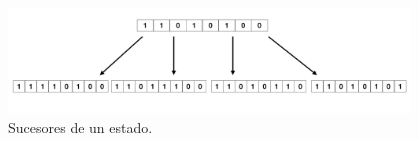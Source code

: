 
 \begin{figure}[H]
  \centering
  \includegraphics[width=0.95\textwidth]{images/succesores.png}
  \caption{Sucesores de un estado.}
  \label{fig:succ-hillClimbing}
\end{figure}


